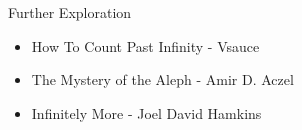 \documentclass[compress,17pt]{beamer}
\begin{document}
\begin{frame}{Further Exploration}
  \begin{itemize}
    \item How To Count Past Infinity - Vsauce
    \item The Mystery of the Aleph - Amir D. Aczel
    \item Infinitely More - Joel David Hamkins
  \end{itemize}
\end{frame}












\end{document}
